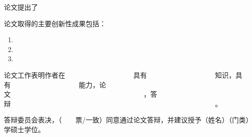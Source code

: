 
{}

\vspace{2em}
	
论文提出了
\vspace{8em}

论文取得的主要创新性成果包括：
\begin{enumerate}
	\item  
	\item 
	\vspace{6em}
	\item 
	\vspace{6em}
\end{enumerate}
\vspace{6em}

论文工作表明作者在~~~~~~~~~~~~~~~~~~~~具有~~~~~~~~~~~~~~~~~~~~知识，具有~~~~~~~~~~~~~~~~~~~~能力，论文~~~~~~~~~~~~~~~~~~~~~~~~~~~~~~~~~~~~~~~，答辩~~~~~~~~~~~~~~~~~~~~~~~~~~~~~~~~~~~~~~~~~~~~~~~~~~~~~~~~~~~~。

答辩委员会表决，（~~~~票/一致）同意通过论文答辩，并建议授予\underline{\quad\quad\quad}（姓名）\underline{\quad\quad\quad}（门类）学硕士学位。
